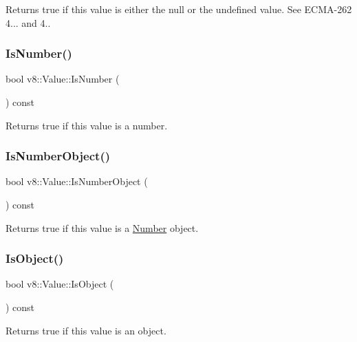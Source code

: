 Returns true if this value is either the null or the undefined value. See E\+C\+M\+A-\/262 4... and 4.. \mbox{\label{classv8_1_1Value_a6ef42a28c0bc70022acb7e308bda4e19}} 
\subsubsection{\texorpdfstring{Is\+Number()}{IsNumber()}}
{\footnotesize\ttfamily bool v8\+::\+Value\+::\+Is\+Number (\begin{DoxyParamCaption}{ }\end{DoxyParamCaption}) const}

Returns true if this value is a number. \mbox{\label{classv8_1_1Value_a497018ef8c5ed946e1c0c30554bad3f8}} 
\subsubsection{\texorpdfstring{Is\+Number\+Object()}{IsNumberObject()}}
{\footnotesize\ttfamily bool v8\+::\+Value\+::\+Is\+Number\+Object (\begin{DoxyParamCaption}{ }\end{DoxyParamCaption}) const}

Returns true if this value is a \mbox{\hyperlink{classv8_1_1Number}{Number}} object. \mbox{\label{classv8_1_1Value_a72a01e06e897a8fedbb430cdd7fc3ffe}} 
\subsubsection{\texorpdfstring{Is\+Object()}{IsObject()}}
{\footnotesize\ttfamily bool v8\+::\+Value\+::\+Is\+Object (\begin{DoxyParamCaption}{ }\end{DoxyParamCaption}) const}

Returns true if this value is an object. \mbox{\label{classv8_1_1Value_a4b0be5d9dc3a857fee9ba7dac07123e3}} 
